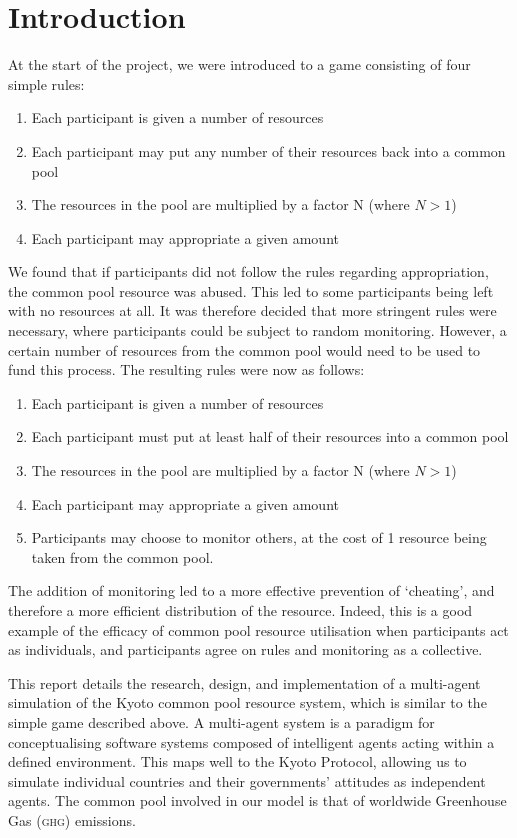 \section{Introduction}

At the start of the project, we were introduced to a game consisting of four simple rules:

\begin{enumerate}
\item Each participant is given a number of resources
\item Each participant may put any number of their resources back into a common pool
\item	The resources in the pool are multiplied by a factor N (where $N > 1$)
\item	Each participant may appropriate a given amount
\end{enumerate}

We found that if participants did not follow the rules regarding appropriation, the common pool resource was abused. This led to some participants being left with no resources at all. It was therefore decided that more stringent rules were necessary, where participants could be subject to random monitoring. However, a certain number of resources from the common pool would need to be used to fund this process. The resulting rules were now as follows:

\begin{enumerate}
	\item Each participant is given a number of resources
	\item Each participant must put at least half of their resources into a common pool
	\item The resources in the pool are multiplied by a factor N (where $N > 1$)
	\item Each participant may appropriate a given amount
	\item Participants may choose to monitor others, at the cost of 1 resource being taken from the common pool.
\end{enumerate}

The addition of monitoring led to a more effective prevention of `cheating', and therefore a more efficient distribution of the resource. Indeed, this is a good example of the efficacy of common pool resource utilisation when participants act as individuals, and participants agree on rules and monitoring as a collective.

This report details the research, design, and implementation of a multi-agent simulation of the Kyoto common pool resource system, which is similar to the simple game described above. A multi-agent system is a paradigm for conceptualising software systems composed of intelligent agents acting within a defined environment. This maps well to the Kyoto Protocol, allowing us to simulate individual countries and their governments' attitudes as independent agents. The common pool involved in our model is that of worldwide Greenhouse Gas (\textsc{ghg}) emissions.

